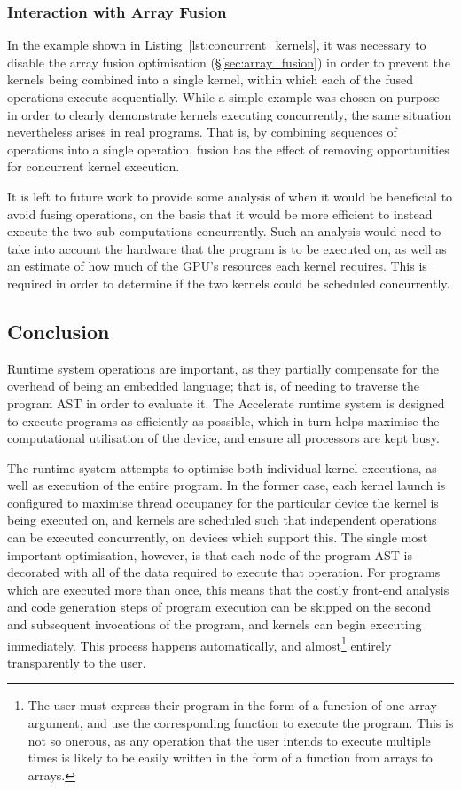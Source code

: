 \subsubsection{Interaction with Array Fusion}

In the example shown in Listing~\ref{lst:concurrent_kernels}, it was necessary
to disable the array fusion optimisation (\S\ref{sec:array_fusion}) in order to
prevent the kernels being combined into a single kernel, within which each of
the fused operations execute sequentially. While a simple example was chosen on
purpose in order to clearly demonstrate kernels executing concurrently, the same
situation nevertheless arises in real programs. That is, by combining sequences
of operations into a single operation, fusion has the effect of removing
opportunities for concurrent kernel execution.

It is left to future work to provide some analysis of when it would be
beneficial to avoid fusing operations, on the basis that it would be more
efficient to instead execute the two sub-computations concurrently. Such an
analysis would need to take into account the hardware that the program is to be
executed on, as well as an estimate of how much of the GPU's resources each
kernel requires. This is required in order to determine if the two kernels could
be scheduled concurrently.


\subsection{Conclusion}

Runtime system operations are important, as they partially compensate for the
overhead of being an embedded language; that is, of needing to traverse the
program AST in order to evaluate it. The Accelerate runtime system is designed
to execute programs as efficiently as possible, which in turn helps maximise the
computational utilisation of the device, and ensure all processors are kept
busy.

The runtime system attempts to optimise both individual kernel executions, as
well as execution of the entire program. In the former case, each kernel launch
is configured to maximise thread occupancy for the particular device the kernel
is being executed on, and kernels are scheduled such that independent operations
can be executed concurrently, on devices which support this. The single most
important optimisation, however, is that each node of the program AST is
decorated with all of the data required to execute that operation. For programs
which are executed more than once, this means that the costly front-end analysis
and code generation steps of program execution can be skipped on the second and
subsequent invocations of the program, and kernels can begin executing
immediately. This process happens automatically, and almost\footnote{The user
must express their program in the form of a function of one array argument,
and use the corresponding  function to execute the program. This is
not so onerous, as any operation that the user intends to execute multiple times
is likely to be easily written in the form of a function from arrays to arrays.}
entirely transparently to the user.

